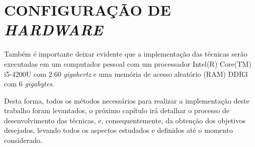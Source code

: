 \section{CONFIGURAÇÃO DE \textit{HARDWARE}}
Também é importante deixar evidente que a implementação das técnicas serão executadas em um computador pessoal com um processador Intel(R) Core(TM) i5-4200U com 2.60 \textit{gigahertz} e uma memória de acesso aleatório (RAM) DDR3 com 6 \textit{gigabytes}. 

Desta forma, todos os métodos necessários para realizar a implementação deste trabalho foram levantados, o próximo capítulo irá detalhar o processo de desenvolvimento das técnicas, e, consequentemente, da obtenção dos objetivos desejados, levando todos os aspectos estudados e definidos até o momento considerado. 
